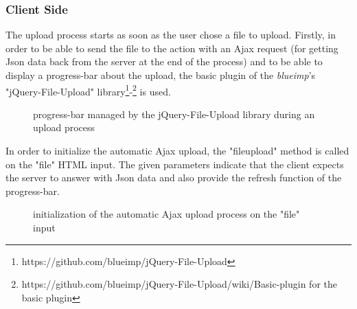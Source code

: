 \documentclass[a4paper,11pt]{report}
\begin{document}
\subsubsection{Client Side}
The upload process starts as soon as the user chose a file to upload. Firstly, in order to be able to send the file to the action with an Ajax request (for getting Json data back from the server at the end of the process) and to be able to display a progress-bar about the upload, the basic plugin of the \emph{blueimp}'s "jQuery-File-Upload" library\footnote{https://github.com/blueimp/jQuery-File-Upload}-\footnote{https://github.com/blueimp/jQuery-File-Upload/wiki/Basic-plugin for the basic plugin} is used.
\begin{figure}[H]
\vspace{-5pt}
\begin{center}
\vspace{-5pt}
\caption{progress-bar managed by the jQuery-File-Upload library during an upload process}
\end{center}
\end{figure}

In order to initialize the automatic Ajax upload, the "fileupload" method is called on the "file" HTML input. The given parameters indicate that the client expects the server to answer with Json data and also provide the refresh function of the progress-bar.
\begin{figure}[H]
\vspace{-5pt}
\begin{center}
\vspace{-5pt}
\caption{initialization of the automatic Ajax upload process on the "file" input}
\end{center}
\end{figure}
\end{document}
